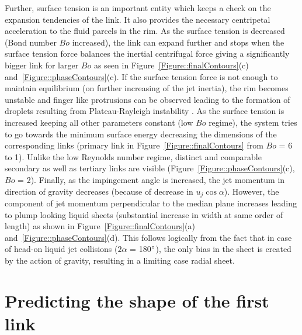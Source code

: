 \documentclass[%
aip,
sd,%
amsmath,amssymb,
preprint,%
author-year,%
]{revtex4-1}
\begin{document}
Further, surface tension is an important entity which keeps a check on the expansion tendencies of the link. It also provides the necessary centripetal acceleration to the fluid parcels in the rim. As the surface tension is decreased (Bond number $Bo$ increased), the link can expand further and stops when the surface tension force balances the inertial centrifugal force giving a significantly bigger link for larger $Bo$ as seen in Figure~\ref{Figure::finalContours}(c) and~\ref{Figure::phaseContours}(c). If the surface tension force is not enough to maintain equilibrium (on further increasing of the jet inertia), the rim becomes unstable and finger like protrusions can be observed leading to the formation of droplets resulting from Plateau-Rayleigh instability \citep{bremond2006atomization}. As the surface tension is increased keeping all other parameters constant (low $Bo$ regime), the system tries to go towards the minimum surface energy decreasing the dimensions of the corresponding links (primary link in Figure~\ref{Figure::finalContours} from $Bo$ = 6 to 1). Unlike the low Reynolds number regime, distinct and comparable secondary as well as tertiary links are visible (Figure~\ref{Figure::phaseContours}(c), $Bo$ = 2). Finally, as the impingement angle is increased, the jet momentum in direction of gravity decreases (because of decrease in $u_j\cos\alpha$). However, the component of jet momentum perpendicular to the median plane increases leading to plump looking liquid sheets (substantial increase in width at same order of length) as shown in Figure~\ref{Figure::finalContours}(a) and~\ref{Figure::phaseContours}(d). This follows logically from the fact that in case of head-on liquid jet collisions ($2\alpha$ = 180$\degree$), the only bias in the sheet is created by the action of gravity, resulting in a limiting case radial sheet. 
\cleardoublepage
\section{Predicting the shape of the first link}
\label{Section::Models}
\end{document}
